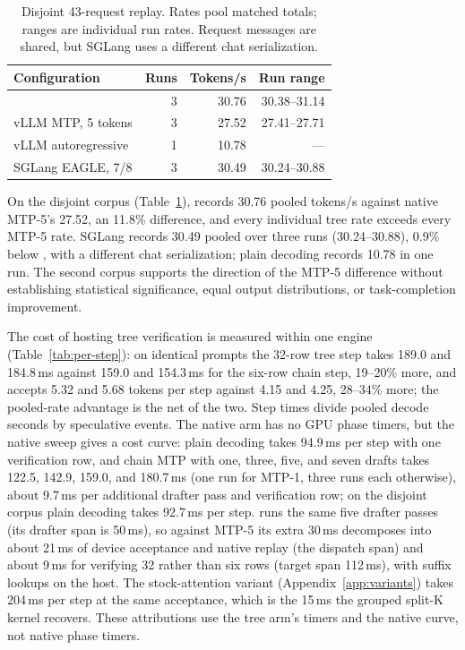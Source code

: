 \begin{table}[t]
\caption{Disjoint 43-request replay. Rates pool matched totals; ranges are individual run rates. Request messages are shared, but SGLang uses a different chat serialization.}
\label{tab:disjoint-replay}
\centering\small
\begin{tabular}{@{}lrrr@{}}
\toprule
Configuration & Runs & Tokens/s & Run range \\
\midrule
\sys{} & 3 & 30.76 & 30.38--31.14 \\
vLLM MTP, 5 tokens & 3 & 27.52 & 27.41--27.71 \\
vLLM autoregressive & 1 & 10.78 & --- \\
SGLang EAGLE, 7/8 & 3 & 30.49 & 30.24--30.88 \\
\bottomrule
\end{tabular}
\end{table}

On the disjoint corpus (Table~\ref{tab:disjoint-replay}), \sys{} records 30.76 pooled tokens/s against native MTP-5's 27.52, an 11.8\% difference, and every individual tree rate exceeds every MTP-5 rate. SGLang records 30.49 pooled over three runs (30.24--30.88), 0.9\% below \sys{}, with a different chat serialization; plain decoding records 10.78 in one run. The second corpus supports the direction of the MTP-5 difference without establishing statistical significance, equal output distributions, or task-completion improvement.

The cost of hosting tree verification is measured within one engine (Table~\ref{tab:per-step}): on identical prompts the 32-row tree step takes 189.0 and 184.8\,ms against 159.0 and 154.3\,ms for the six-row chain step, 19--20\% more, and accepts 5.32 and 5.68 tokens per step against 4.15 and 4.25, 28--34\% more; the pooled-rate advantage is the net of the two. Step times divide pooled decode seconds by speculative events. The native arm has no GPU phase timers, but the native sweep gives a cost curve: plain decoding takes 94.9\,ms per step with one verification row, and chain MTP with one, three, five, and seven drafts takes 122.5, 142.9, 159.0, and 180.7\,ms (one run for MTP-1, three runs each otherwise), about 9.7\,ms per additional drafter pass and verification row; on the disjoint corpus plain decoding takes 92.7\,ms per step. \sys{} runs the same five drafter passes (its drafter span is 50\,ms), so against MTP-5 its extra 30\,ms decomposes into about 21\,ms of device acceptance and native replay (the dispatch span) and about 9\,ms for verifying 32 rather than six rows (target span 112\,ms), with suffix lookups on the host. The stock-attention variant (Appendix~\ref{app:variants}) takes 204\,ms per step at the same acceptance, which is the 15\,ms the grouped split-K kernel recovers. These attributions use the tree arm's timers and the native curve, not native phase timers.

